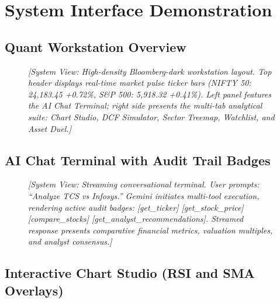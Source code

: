 \documentclass[12pt,a4paper]{report}
\begin{document}
\section{System Interface Demonstration}

\subsection{Quant Workstation Overview}

\begin{figure}[h!]
\centering
\begin{tcolorbox}[colback=gray!10,colframe=gray!50,
  title=\textbf{Fig 4.1 -- Quant Workstation Overview},fonttitle=\bfseries\small]
  \centering
  \vspace{0.3cm}
  {\small\textit{[System View: High-density Bloomberg-dark workstation layout. Top header displays real-time market pulse ticker bars (NIFTY 50: 24,183.45 +0.72\%, S\&P 500: 5,918.32 +0.41\%). Left panel features the AI Chat Terminal; right side presents the multi-tab analytical suite: Chart Studio, DCF Simulator, Sector Treemap, Watchlist, and Asset Duel.]}}
  \vspace{0.3cm}
\end{tcolorbox}
\end{figure}

\subsection{AI Chat Terminal with Audit Trail Badges}

\begin{figure}[h!]
\centering
\begin{tcolorbox}[colback=gray!10,colframe=gray!50,
  title=\textbf{Fig 4.2 -- AI Terminal with Dynamic Audit Trail},fonttitle=\bfseries\small]
  \centering
  \vspace{0.3cm}
  {\small\textit{[System View: Streaming conversational terminal. User prompts: ``Analyze TCS vs Infosys.'' Gemini initiates multi-tool execution, rendering active audit badges: [get\_ticker] [get\_stock\_price] [compare\_stocks] [get\_analyst\_recommendations]. Streamed response presents comparative financial metrics, valuation multiples, and analyst consensus.]}}
  \vspace{0.3cm}
\end{tcolorbox}
\end{figure}

\subsection{Interactive Chart Studio (RSI and SMA Overlays)}
\end{document}
